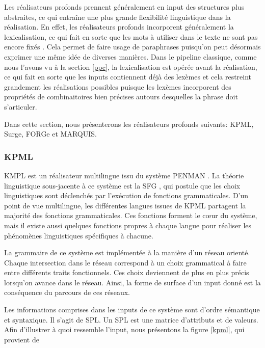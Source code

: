 Les réalisateurs profonds prennent généralement en input des structures plus abstraites, ce qui entraîne une plus grande flexibilité linguistique dans la réalisation. En effet, les réalisateurs profonds incorporent généralement la lexicalisation, ce qui fait en sorte que les mots à utiliser dans le texte ne sont pas encore fixés \citep{PolguerePourmodelestratifie}. Cela permet de faire usage de paraphrases puisqu'on peut désormais exprimer une même idée de diverses manières. Dans le pipeline classique, comme nous l'avons vu à la section \ref{ppc}, la lexicalisation est opérée avant la réalisation, ce qui fait en sorte que les inputs contiennent déjà des lexèmes et cela restreint grandement les réalisations possibles puisque les lexèmes incorporent des propriétés de combinaitoires bien précises autours desquelles la phrase doit s'articuler. 

Dans cette section, nous présenterons les réalisateurs profonds suivants: KPML, Surge, FORGe et MARQUIS.

\subsubsection{KPML}
KMPL \citep{BatemanEnablingTechnologyMultilingual1997} est un réalisateur multilingue issu du système PENMAN \citep{PenmanOverview}. La théorie linguistique sous-jacente à ce système est la \ac{SFG} \citep{MatthiessenSystemicfunctionalgrammar1997}, qui postule que les choix linguistiques sont déclenchés par l'exécution de fonctions grammaticales. D'un point de vue multilingue, les différentes langues issues de KPML partagent la majorité des fonctions grammaticales. Ces fonctions forment le c\oe{}ur du système, mais il existe aussi quelques fonctions propres à chaque langue pour réaliser les phénomènes linguistiques spécifiques à chacune.

La grammaire de ce système est implémentée à la manière d'un réseau orienté. Chaque intersection dans le réseau correspond à un choix grammatical à faire entre différents traits fonctionnels. Ces choix deviennent de plus en plus précis lorsqu'on avance dans le réseau. Ainsi, la forme de surface d'un input donné est la conséquence du parcours de ces réseaux.

Les informations comprises dans les inputs de ce système sont d'ordre sémantique et syntaxique. Il s'agit de \ac{SPL}. Un \ac{SPL} est une matrice d'attributs et de valeurs. Afin d'illustrer à quoi ressemble l'input, nous présentons la figure \ref{kpml}, qui provient de \cite{ReiterBuildingNaturalLanguage2000} 

